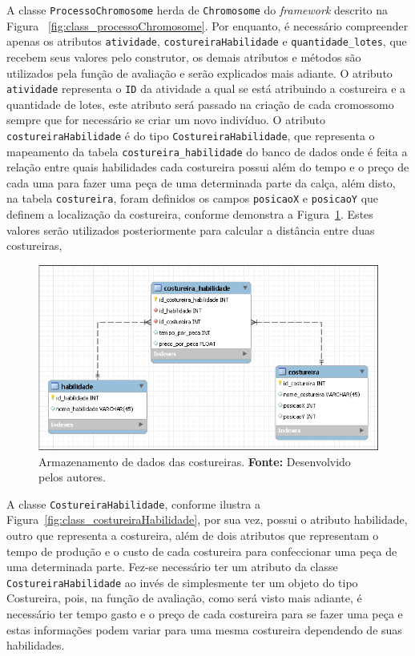 \par A classe \texttt{ProcessoChromosome} herda de \texttt{Chromosome} do
\textit{framework} descrito na Figura ~\ref{fig:class_processoChromosome}. Por
enquanto, é necessário compreender apenas os atributos \texttt{atividade}, \texttt{costureiraHabi\-lidade} e
\texttt{quantidade\_lotes}, que recebem seus valores pelo construtor, os
demais atributos e métodos são utilizados pela função de avaliação e serão explicados mais adiante. 
O atributo \texttt{atividade} representa o \texttt{ID} da
atividade a qual se está atribuindo a costureira e a
quantidade de lotes, este atributo será passado na criação de cada cromossomo
sempre que for necessário se criar um novo indivíduo. O atributo \texttt{costureiraHabilidade} 
é do tipo \texttt{CostureiraHabilidade}, que representa o mapeamento da tabela \texttt{costureira\_habilidade} do banco de dados onde 
é feita a relação entre quais habilidades cada costureira possui além do tempo e o preço de cada uma para 
fazer uma peça de uma determinada parte da calça, além disto, na tabela \texttt{costureira}, foram definidos os campos \texttt{posicaoX} e \texttt{posicaoY} que definem a localização da costureira, conforme demonstra a Figura~\ref{fig:dados_costureiras}. Estes valores serão utilizados posteriormente para calcular a distância entre duas costureiras, 

\newpage

\begin{figure}[h!]
	\centerline{\includegraphics[scale=0.6]{./imagens/costureira_habilidade_tabela.png}}
	\caption[Armazenamento de dados das costureiras.]
	{Armazenamento de dados das costureiras. \textbf{Fonte:} Desenvolvido pelos
	autores.}
	\label{fig:dados_costureiras}
\end{figure}


\par A classe \texttt{CostureiraHabilidade}, conforme ilustra a Figura~\ref{fig:class_costureiraHabilidade}, por sua vez, possui o atributo habilidade, outro que
representa a costureira, além de dois atributos que representam o tempo de produção e o custo 
de cada costureira para confeccionar uma peça de uma determinada parte. Fez-se
necessário ter um atributo da classe \texttt{CostureiraHabilidade} ao invés de simplesmente ter um objeto do tipo Costureira, pois, 
na função de avaliação, como será visto mais adiante, é necessário ter tempo gasto e o preço de cada costureira para se fazer uma peça 
e estas informações podem variar para uma mesma costureira dependendo de suas habilidades.


